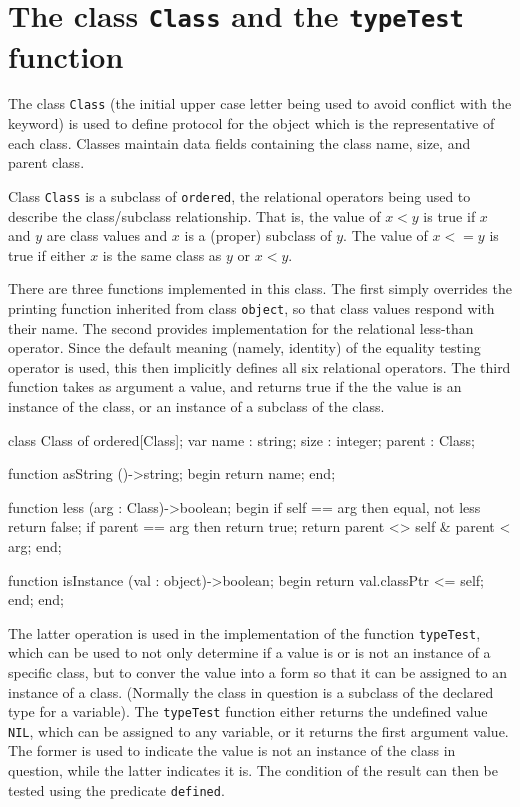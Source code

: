 \section{The class {\tt Class} and the {\tt typeTest} function}

The class {\tt Class} (the initial upper case letter being used to
avoid conflict with the keyword) is used to define protocol for
the object which is the representative of each class.
Classes maintain data fields containing the class name, size,
and parent class.

Class {\tt Class} is a subclass of {\tt ordered}, the relational operators
being used to describe the class/subclass relationship.  That is,
the value of $x < y$ is true if $x$ and $y$ are class values and $x$ is
a (proper) subclass of $y$.  The value of $x <= y$ is true if either $x$ is
the same class as $y$ or $x < y$.

There are three functions implemented in this class.
The first simply overrides the printing function inherited from
class {\tt object}, so that class values respond with their
name.  The second provides implementation for the relational less-than
operator.  Since the default meaning (namely, identity) of the equality 
testing operator is used,
this then implicitly defines all six relational operators.
The third function takes as argument a value, and returns true
if the the value is an instance of the class, or an instance of
a subclass of the class.

\begin{cprog}

class Class of ordered[Class];
var
	name : string;
	size : integer;
	parent : Class;

	function asString ()->string;
	begin
		return name;
	end;

	function less (arg : Class)->boolean;
	begin
		if self == arg then	{ equal, not less }
			return false;
		if parent == arg then
			return true;
		return parent <> self & parent < arg;
	end;

	function isInstance (val : object)->boolean;
	begin
		return val.classPtr <= self;
	end;
end;

\end{cprog}

The latter operation is used in the implementation of the
function {\tt typeTest}, which can be used to not only determine if a value is
or is not an instance of a specific class, but to conver the value into
a form so that it can be assigned to an instance of a class.
(Normally the class in question is a subclass of
the declared type for a variable).  The {\tt typeTest} function
either returns the undefined value {\tt NIL}, which can be assigned to
any variable, or it returns the
first argument value.  The former is used to indicate the value is
not an instance of the class in question, while the latter indicates
it is.  The condition of the result can then be tested using
the predicate {\tt defined}.

